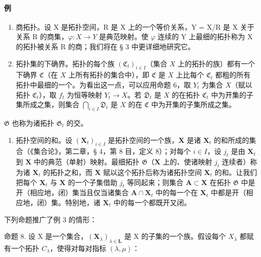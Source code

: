 \paragraph*{例}

\begin{enumerate}
\def\labelenumi{\arabic{enumi})}
\item
  商拓扑。设 X 是拓扑空间，R 是 X 上的一个等价关系，Y = X/R 是 X 关于关系 R 的商集，\(\varphi: X \to Y\) 是典范映射。使 \(\varphi\) 连续的 Y 上最细的拓扑称为 X 的拓扑被关系 R 的商；我们将在 § 3 中更详细地研究它。
\item
  拓扑集的下确界。拓扑的每个族 \((\mathfrak{C}_t)_{i \in I}\)（集合 \(X\) 上的拓扑的族）都有一个下确界 \(\mathfrak{C}\)（在 \(X\) 上所有拓扑的集合中），即 \(\mathfrak{C}\) 是 \(X\) 上比每个 \(\mathfrak{C}_t\) 都粗的所有拓扑中最细的一个。为看出这一点，可以应用命题 6，取 \(Y_t\) 为集合 \(X\)（赋以拓扑 \(\mathfrak{C}_t\)），取 \(f_t\) 为恒等映射 \(Y_t \to X\)。若 \(\mathfrak{D}_t\) 是 \(X\) 的在拓扑 \(\mathfrak{C}_t\) 中为开集的子集所成之集，则集合 \(\bigcap_{i \in I} \mathfrak{D}_t\) 是 \(X\) 的在 \(\mathfrak{C}\) 中为开集的子集所成之集。
\end{enumerate}

\(\mathfrak{G}\) 也称为诸拓扑 \(\mathfrak{G}_{t}\) 的交。

\begin{enumerate}
\def\labelenumi{\arabic{enumi})}
\setcounter{enumi}{2}
\tightlist
\item
  拓扑空间的和。设 \((\mathbf{X}_t)_{i \in I}\) 是拓扑空间的一个族，\(\mathbf{X}\) 是诸 \(\mathbf{X}_t\) 的和所成的集合（《集合论》，第二章，§ 4，第 8 目，定义 8）；对每个 \(i \in I\)，设 \(j_t\) 是由 \(\mathbf{X}_t\) 到 \(\mathbf{X}\) 中的典范（单射）映射。最细拓扑 \(\mathfrak{G}\)（\(\mathbf{X}\) 上的、使诸映射 \(j_t\) 连续者）称为诸 \(\mathbf{X}_t\) 的拓扑之和，而 \(\mathbf{X}\) 赋以这个拓扑后称为诸拓扑空间 \(\mathbf{X}_t\) 的和。让我们把每个 \(\mathbf{X}_t\) 与 \(\mathbf{X}\) 的一个子集借助 \(j_t\) 等同起来；则集合 \(\mathbf{A} \subset \mathbf{X}\) 在拓扑 \(\mathfrak{G}\) 中是开（相应地，闭）集当且仅当诸集合 \(\mathbf{A} \cap \mathbf{X}_t\) 中的每一个在 \(\mathbf{X}_t\) 中都是开（相应地，闭）集。特别地，诸 \(\mathbf{X}_t\) 中的每一个都既开又闭。
\end{enumerate}

下列命题推广了例 3 的情形：

命题 8. 设 X 是一个集合，\((\mathbf{X}_{\lambda})_{\lambda \in \mathbf{L}}\) 是 X 的子集的一个族。假设每个 \(X_{\lambda}\) 都赋有一个拓扑 \(C_{\lambda}\)，使得对每对指标 \((\lambda, \mu)\)：


